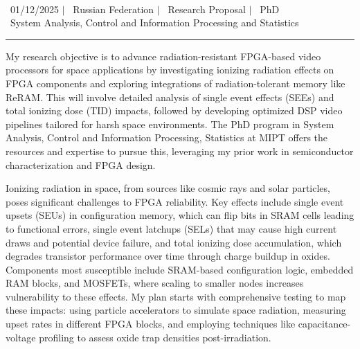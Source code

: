 \documentclass[a4paper,12pt]{article}
\begin{document}
\begin{center}
    {\Huge \scshape {\fontsize{25}{30}\selectfont{Reza}} {\fontsize{25}{30}}} \\ 
    \vspace{3pt}
    {\small \raisebox{-0.2\height}\ {01/12/2025}} $|$
    {\small \raisebox{-0.2\height}\ {Russian Federation}} $|$
    {\small \raisebox{-0.2\height}\ {Research Proposal}} $|$
    {\small \raisebox{-0.2\height}\ {PhD}}
    \\
    {\small \raisebox{-0.2\height}\ {System Analysis, Control and Information Processing and Statistics}} 
    \vspace{-10pt}
\end{center}
\vspace{-10pt}

\noindent\rule{\textwidth}{1pt}

My research objective is to advance radiation-resistant FPGA-based video processors for space applications by investigating ionizing radiation effects on FPGA components and exploring integrations of radiation-tolerant memory like ReRAM. This will involve detailed analysis of single event effects (SEEs) and total ionizing dose (TID) impacts, followed by developing optimized DSP video pipelines tailored for harsh space environments. The PhD program in System Analysis, Control and Information Processing, Statistics at MIPT offers the resources and expertise to pursue this, leveraging my prior work in semiconductor characterization and FPGA design.

\vspace{10pt}

Ionizing radiation in space, from sources like cosmic rays and solar particles, poses significant challenges to FPGA reliability. Key effects include single event upsets (SEUs) in configuration memory, which can flip bits in SRAM cells leading to functional errors, single event latchups (SELs) that may cause high current draws and potential device failure, and total ionizing dose accumulation, which degrades transistor performance over time through charge buildup in oxides. Components most susceptible include SRAM-based configuration logic, embedded RAM blocks, and MOSFETs, where scaling to smaller nodes increases vulnerability to these effects. My plan starts with comprehensive testing to map these impacts: using particle accelerators to simulate space radiation, measuring upset rates in different FPGA blocks, and employing techniques like capacitance-voltage profiling to assess oxide trap densities post-irradiation.
\end{document}
